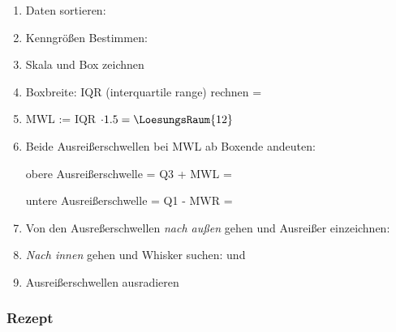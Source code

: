 \begin{enumerate}

\item Daten sortieren: 

\item Kenngrößen Bestimmen: 

\item Skala und Box zeichnen

\item Boxbreite: IQR (interquartile range) rechnen =
\item MWL := IQR $\cdot{} 1.5 = \LoesungsRaum{12}$
  
\item Beide Ausreißerschwellen bei MWL ab Boxende andeuten:

  obere Ausreißerschwelle = Q3 + MWL = 

  untere Ausreißerschwelle = Q1 - MWR = 

  \item Von den Ausreßerschwellen \textit{nach außen} gehen und
    Ausreißer einzeichnen: 

  \item \textit{Nach innen} gehen und Whisker suchen:
     und 
    
  \item Ausreißerschwellen ausradieren
\end{enumerate}




\subsubsection{Rezept}




